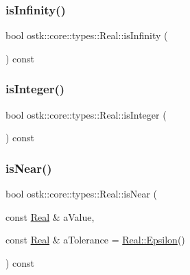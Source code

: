 \mbox{\label{classostk_1_1core_1_1types_1_1_real_a9c5de2adb5ee58d89f1a09111386a11c}} 
\subsubsection{\texorpdfstring{is\+Infinity()}{isInfinity()}}
{\footnotesize\ttfamily bool ostk\+::core\+::types\+::\+Real\+::is\+Infinity (\begin{DoxyParamCaption}{ }\end{DoxyParamCaption}) const}

\mbox{\label{classostk_1_1core_1_1types_1_1_real_ae2d39e5629e641c2303cdd603aa078f5}} 
\subsubsection{\texorpdfstring{is\+Integer()}{isInteger()}}
{\footnotesize\ttfamily bool ostk\+::core\+::types\+::\+Real\+::is\+Integer (\begin{DoxyParamCaption}{ }\end{DoxyParamCaption}) const}

\mbox{\label{classostk_1_1core_1_1types_1_1_real_a1f516b7b30733dcda1a7af90571dca22}} 
\subsubsection{\texorpdfstring{is\+Near()}{isNear()}}
{\footnotesize\ttfamily bool ostk\+::core\+::types\+::\+Real\+::is\+Near (\begin{DoxyParamCaption}\item[{const \hyperlink{classostk_1_1core_1_1types_1_1_real}{Real} \&}]{a\+Value,  }\item[{const \hyperlink{classostk_1_1core_1_1types_1_1_real}{Real} \&}]{a\+Tolerance = {\ttfamily \hyperlink{classostk_1_1core_1_1types_1_1_real_a90fb5e0984bc7b71a4e4a5651c1933c2}{Real\+::\+Epsilon}()} }\end{DoxyParamCaption}) const}

